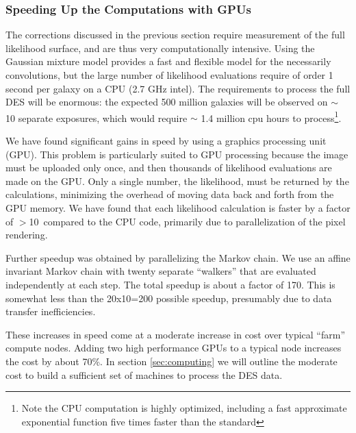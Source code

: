 \documentclass[12pt]{article}
\newcommand{\speedupnum}{10}
\newcommand{\overallspeedup}{170}
\begin{document}
\subsubsection{Speeding Up the Computations with GPUs} \label{sec:gmix:gpu}

The corrections discussed in the previous section require measurement of the
full likelihood surface, and are thus very computationally intensive.  Using
the Gaussian mixture model provides a fast and flexible model for the
necessarily convolutions, but the large number of likelihood evaluations
require of order 1 second per galaxy on a CPU (2.7 GHz intel). The requirements
to process the full DES will be enormous: the expected 500 million galaxies
will be observed on $\sim$ 10 separate exposures, which would require $\sim$
1.4 million cpu hours to process\footnote{Note the CPU computation is highly
optimized, including a fast approximate exponential function five times faster
than the standard}. 

We have found significant gains in speed by using a graphics processing unit
(GPU).  This problem is particularly suited to GPU processing because the image
must be uploaded only once, and then thousands of likelihood evaluations are
made on the GPU. Only a single number, the likelihood, must be returned by the
calculations, minimizing the overhead of moving data back and forth from the
GPU memory.  We have found that each likelihood calculation is faster by a
factor of $>$\speedupnum\ compared to the CPU code, primarily due to
parallelization of the pixel rendering.

Further speedup was obtained by parallelizing the Markov chain.  We use an
affine invariant Markov chain\cite{GoodmanWeare10} with twenty separate
``walkers'' that are evaluated independently at each step.  The total speedup
is about a factor of \overallspeedup.  This is somewhat less than the 20x10=200
possible speedup, presumably due to data transfer inefficiencies.

These increases in speed come at a moderate increase in cost over typical
``farm'' compute nodes.  Adding two high performance GPUs to a typical node
increases the cost by about 70\%. In section \ref{sec:computing} we will
outline the moderate cost to build a sufficient set of machines to process the
DES data.
\end{document}
